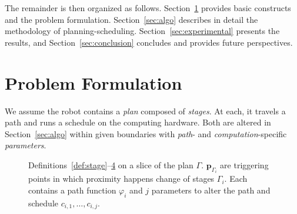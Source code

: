 \documentclass[letterpaper,10pt,journal,twoside]{IEEEtran}
\newcommand{\figpath}{./figures}
\theoremstyle{definition}
\begin{document}
The %
{\color{blue}remainder is} then organized as follows. Section~\ref{sec:prob} provides basic constructs%
{ \color{blue}and} the problem formulation. Section~\ref{sec:algo} describes in detail the methodology of planning-scheduling. Section~\ref{sec:experimental} presents the results, %
and Section~\ref{sec:conclusion} concludes and provides future perspectives. %

\vspace*{-1ex}
\section{Problem Formulation}  %
\label{sec:prob}               %
{\color{blue}W}e assume %
{\color{blue}the }robot contains a \emph{plan} composed of \emph{stages}. At each, %
{\color{blue}it }travels a path and runs a schedule on the computing hardware. Both are %
altered in Section~\ref{sec:algo} within given boundaries with \emph{path}- and \emph{computation}-specific \emph{parameters}.%

\begin{figure}[t]
  \footnotesize
  \begin{minipage}[l]{0.40\columnwidth}
    \caption{Definitions~\ref{def:stage}--\hyperref[def:plan]{4} on a slice of the plan $\Gamma$. $\mathbf{p}_{\Gamma_i}$ are triggering points in which proximity happens change of stages $\Gamma_i$. Each contains a path function $\varphi_i$ and $j$ parameters to alter the path and schedule $c_{i,1},\dots,c_{i,j}$.}
    \label{fig:traj1}
  \end{minipage}\hfill
  \begin{minipage}[c]{0.56\columnwidth}
    \centering
    \vspace*{-4ex}
    
  \end{minipage}
  \vspace*{-4.5ex}
\end{figure}
\end{document}
